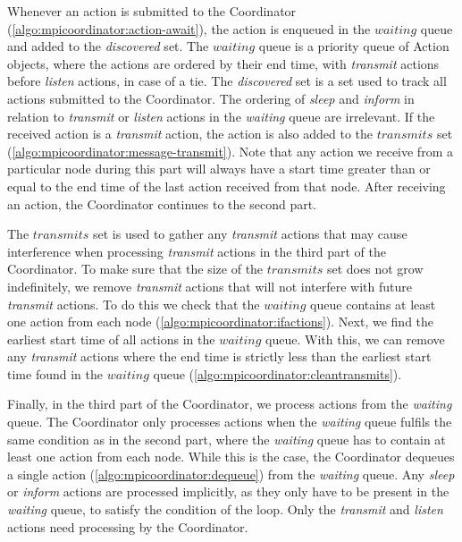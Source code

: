 Whenever an action is submitted to the Coordinator (\autoref{algo:mpicoordinator:action-await}), the action is
enqueued in the $\mathit{waiting}$ queue and added to the \textit{discovered} set. The $\mathit{waiting}$
queue is a priority queue of Action objects, where the actions are ordered by their end time, with
\textit{transmit} actions before \textit{listen} actions, in case of a tie. The \textit{discovered} set is
a set used to track all actions submitted to the Coordinator. The ordering of \textit{sleep} and
\textit{inform} in relation to \textit{transmit} or \textit{listen} actions in the \textit{waiting} queue are
irrelevant. If the received action is a \textit{transmit} action, the action is also added to the
$\mathit{transmits}$ set (\autoref{algo:mpicoordinator:message-transmit}). Note that any action we receive
from a particular node during this part will always have a start time greater than or equal to the end time of
the last action received from that node. After receiving an action, the Coordinator continues to the second
part. \medbreak

The $\mathit{transmits}$ set is used to gather any \textit{transmit} actions that may cause interference when
processing \textit{transmit} actions in the third part of the Coordinator. To make sure that the size
of the $\mathit{transmits}$ set does not grow indefinitely, we remove \textit{transmit} actions that will not
interfere with future \textit{transmit} actions. To do this we check that the $\mathit{waiting}$ queue
contains at least one action from each node (\autoref{algo:mpicoordinator:ifactions}). Next, we find the
earliest start time of all actions in the $\mathit{waiting}$ queue. With this, we can remove any
\textit{transmit} actions where the end time is strictly less than the earliest start time found in the
$\mathit{waiting}$ queue (\autoref{algo:mpicoordinator:cleantransmits}). \medbreak

Finally, in the third part of the Coordinator, we process actions from the \textit{waiting} queue. The
Coordinator only processes actions when the \textit{waiting} queue fulfils the same condition as in the second
part, where the \textit{waiting} queue has to contain at least one action from each node. While this is the
case, the Coordinator dequeues a single action (\autoref{algo:mpicoordinator:dequeue}) from the
\textit{waiting} queue. Any \textit{sleep} or \textit{inform} actions are processed implicitly, as they only
have to be present in the \textit{waiting} queue, to satisfy the condition of the loop. Only the
\textit{transmit} and \textit{listen} actions need processing by the Coordinator. \medbreak 

